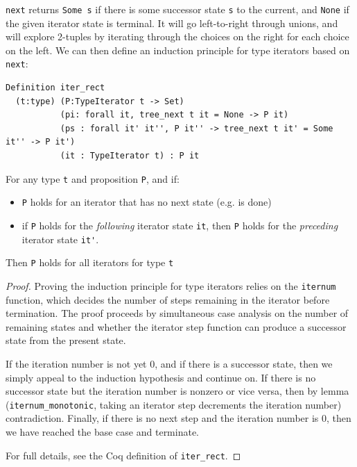 \documentclass[a4paper,english]{lipics-v2019}
\begin{document}
\verb|next| returns \verb|Some s| if there is some successor state
\verb|s| to the current, and \verb|None| if the given iterator state is
terminal. It will go left-to-right through unions, and will explore 2-tuples
by iterating through the choices on the right for each choice on the left. We can
then define an induction principle for type iterators based on \verb|next|:

\begin{theorem}
\begin{small}\begin{verbatim}
Definition iter_rect
  (t:type) (P:TypeIterator t -> Set)
           (pi: forall it, tree_next t it = None -> P it)
           (ps : forall it' it'', P it'' -> tree_next t it' = Some it'' -> P it')
           (it : TypeIterator t) : P it  
\end{verbatim}\end{small}

For any type \verb|t| and proposition \verb|P|, and if:
\begin{itemize} 
	\item \verb|P| holds for an iterator that has no next state (e.g. is done)
	\item if \verb|P| holds for the \emph{following} iterator state \verb|it|,
	then \verb|P| holds for the \emph{preceding} iterator state \verb|it'|.
\end{itemize}
Then \verb|P| holds for all iterators for type \verb|t|
\end{theorem}
\begin{proof}
Proving the induction principle for type iterators relies on the \verb|iternum|
function, which decides the number of steps remaining in the iterator before termination.
The proof proceeds by simultaneous case analysis on the number of remaining states and
whether the iterator step function can produce a successor state from the present state.

If the iteration number is not yet 0, and if there is a successor state, then
we simply  appeal to the induction hypothesis and continue on. If there is no
successor state but  the iteration number is nonzero or vice versa, then by
lemma (\verb|iternum_monotonic|, taking an iterator step decrements the
iteration number) contradiction. Finally, if there is no next step and the iteration
number is 0, then we have reached the base case and terminate.

For full details, see the Coq definition of \verb|iter_rect|.
\end{proof}
\end{document}
